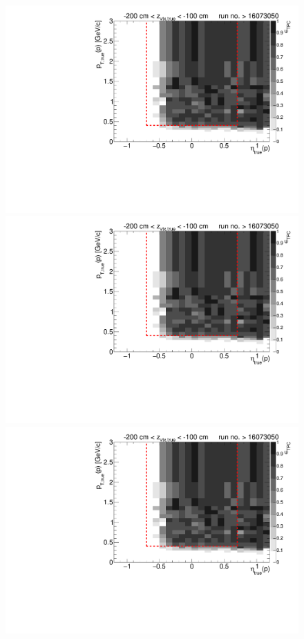 \begin{figure}[hb]
{		\includegraphics[width=\linewidth,page=6]{graphics/eff/Eff2D_TPC_proton_Plus_RunRange2.pdf}\\
		\includegraphics[width=\linewidth,page=8]{graphics/eff/Eff2D_TPC_proton_Plus_RunRange2.pdf}\\
		\includegraphics[width=\linewidth,page=10]{graphics/eff/Eff2D_TPC_proton_Plus_RunRange2.pdf}
	}%
\end{figure}
